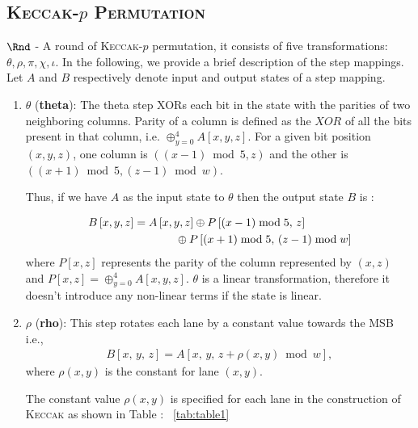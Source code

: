 \documentclass[runningheads]{llncs}
\newcommand{\KECCAK}{\mbox{\textsc{Keccak}}}
\newcommand{\Keccak}{\mbox{\textsc{Keccak}}}
\begin{document}
\subsection*{\textsc{\Keccak-$p$ Permutation}}
$\Rnd$ \;- A round of \KECCAK-$p$ permutation, it consists of five transformations: {$\theta,\rho,\pi,\chi,\iota$}. 
In the following, we provide a brief description of the step mappings.
 Let $A$ and $B$ respectively denote input and output states of a step mapping.
\begin{enumerate}
    \item $\theta$ ({\bf theta}): The theta step XORs each bit in the state with the parities of two neighboring columns. 
		Parity of a column is defined as the $XOR$ of all the bits present in that column, i.e. $\oplus_{y = 0}^{4} A[x, y, z]$. For a given bit position $(x, y, z)$, one column is $((x - 1) \bmod 5, z) $ and the other is $((x+1)\bmod 5, (z - 1) \bmod w)$.
    
    Thus, if we have $A$ as the input state to $\theta$ then the output state $B$ is :
    
    \begin{align}\nonumber
        B\left[x, y, z\right] &= A\left[x, y, z\right] \oplus P\left[ (x - 1) \bmod 5 ,\, z \right] \\
        &\hspace{1.3cm}\oplus P\left[ (x + 1) \bmod 5 ,\, (z - 1) \bmod w \right]
    \end{align}
    where $P[x, z]$ represents the parity of the column represented by $(x, z)$ and $P[x, z]  = \oplus_{y = 0}^{4} A[x, y, z] $.
		$\theta$ is a linear transformation, therefore it doesn't introduce any non-linear terms if the state is linear.
    \vskip5pt
    \item $\rho$ ({\bf rho}): This step rotates each lane by a constant value towards the MSB i.e., 
    \begin{align}
        B[x, \,y,\, z] = A[x, \,y, \,z + \rho(x, y) \bmod w ],
    \end{align}
    where $\rho(x, y)$ is the constant for lane $(x, y)$. 
    
		The constant value $\rho(x, y)$ is specified for each lane in the construction of \Keccak{} as shown in Table : ~\ref{tab:table1} 
		

\end{enumerate}
\end{document}
